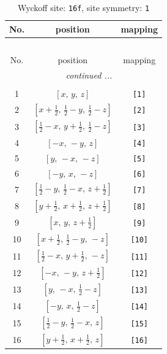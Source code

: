 \documentclass[fleqn,8pt]{jsarticle}
\begin{document}
\begin{longtable}{ccc}
\caption{Wyckoff site: {\tt 16f}, site symmetry: {\tt 1}}
 \\
 \hline \hline
No. & position & mapping \\ \hline \endfirsthead

\multicolumn{2}{l}{\tablename\ \thetable{}} \\
 \hline \hline
No. & position & mapping \\ \hline \endhead

 \hline \hline
\multicolumn{2}{r}{\footnotesize\it continued ...} \\ \endfoot

 \hline \hline
\multicolumn{2}{r}{} \\ \endlastfoot

1 & $\left[ x,\, y,\, z \right]$ & {\tt [1]} \\ \hline
2 & $\left[ x + \frac{1}{2},\, \frac{1}{2} - y,\, \frac{1}{2} - z \right]$ & {\tt [2]} \\ \hline
3 & $\left[ \frac{1}{2} - x,\, y + \frac{1}{2},\, \frac{1}{2} - z \right]$ & {\tt [3]} \\ \hline
4 & $\left[ - x,\, - y,\, z \right]$ & {\tt [4]} \\ \hline
5 & $\left[ y,\, - x,\, - z \right]$ & {\tt [5]} \\ \hline
6 & $\left[ - y,\, x,\, - z \right]$ & {\tt [6]} \\ \hline
7 & $\left[ \frac{1}{2} - y,\, \frac{1}{2} - x,\, z + \frac{1}{2} \right]$ & {\tt [7]} \\ \hline
8 & $\left[ y + \frac{1}{2},\, x + \frac{1}{2},\, z + \frac{1}{2} \right]$ & {\tt [8]} \\ \hline
9 & $\left[ x,\, y,\, z + \frac{1}{2} \right]$ & {\tt [9]} \\ \hline
10 & $\left[ x + \frac{1}{2},\, \frac{1}{2} - y,\, - z \right]$ & {\tt [10]} \\ \hline
11 & $\left[ \frac{1}{2} - x,\, y + \frac{1}{2},\, - z \right]$ & {\tt [11]} \\ \hline
12 & $\left[ - x,\, - y,\, z + \frac{1}{2} \right]$ & {\tt [12]} \\ \hline
13 & $\left[ y,\, - x,\, \frac{1}{2} - z \right]$ & {\tt [13]} \\ \hline
14 & $\left[ - y,\, x,\, \frac{1}{2} - z \right]$ & {\tt [14]} \\ \hline
15 & $\left[ \frac{1}{2} - y,\, \frac{1}{2} - x,\, z \right]$ & {\tt [15]} \\ \hline
16 & $\left[ y + \frac{1}{2},\, x + \frac{1}{2},\, z \right]$ & {\tt [16]} \\
\end{longtable}
\end{document}
